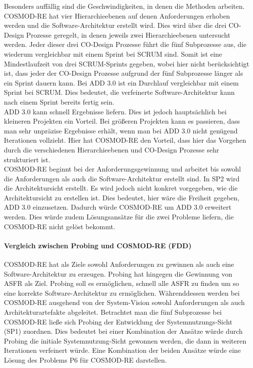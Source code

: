 Besonders auff\"allig sind die Geschwindigkeiten, in denen die Methoden arbeiten. COSMOD-RE hat vier Hierarchieebenen auf denen Anforderungen erhoben werden und die Software-Architektur erstellt wird. Dies wird \"uber die drei CO-Design Prozesse geregelt, in denen jeweils zwei Hierarchieebenen untersucht werden. Jeder dieser drei CO-Design Prozesse f\"uhrt die f\"unf Subprozesse aus, die wiederum vergleichbar mit einem Sprint bei SCRUM sind. Somit ist eine Mindestlaufzeit von drei SCRUM-Sprints gegeben, wobei hier nicht ber\"ucksichtigt ist, dass jeder der CO-Design Prozesse aufgrund der f\"unf Subprozesse l\"anger als ein Sprint dauern kann. Bei ADD 3.0 ist ein Durchlauf vergleichbar mit einem Sprint bei SCRUM. Dies bedeutet, die verfeinerte Software-Architektur kann nach einem Sprint bereits fertig sein.\\

ADD 3.0 kann schnell Ergebnisse liefern. Dies ist jedoch haupts\"achlich bei kleineren Projekten ein Vorteil. Bei gr\"o\ss{}eren Projekten kann es passieren, dass man sehr unpr\"azise Ergebnisse erh\"alt, wenn man bei ADD 3.0 nicht gen\"ugend Iterationen vollzieht. Hier hat COSMOD-RE den Vorteil, dass hier das Vorgehen durch die verschiedenen Hierarchieebenen und CO-Design Prozesse sehr strukturiert ist.\\

COSMOD-RE beginnt bei der Anforderungsgewinnung und arbeitet bis sowohl die Anforderungen als auch die Software-Architektur erstellt sind. In SP2 wird die Architektursicht erstellt. Es wird jedoch nicht konkret vorgegeben, wie die Architektursicht zu erstellen ist. Dies bedeutet, hier w\"are die Freiheit gegeben, ADD 3.0 einzusetzen. Dadurch w\"urde COSMOD-RE um ADD 3.0 erweitert werden. Dies w\"urde zudem L\"osungsans\"atze f\"ur die zwei Probleme liefern, die COSMOD-RE nicht gel\"ost bekommt.\\

\paragraph{Vergleich zwischen Probing und  COSMOD-RE (FDD)}
COSMOD-RE hat als Ziele sowohl Anforderungen zu gewinnen als auch eine Software-Architektur zu erzeugen. Probing hat hingegen die Gewinnung von ASFR als Ziel. Probing soll es erm\"oglichen, schnell alle ASFR zu finden um so eine korrekte Software-Architektur zu erm\"oglichen. W\"ahrenddessen werden bei COSMOD-RE ausgehend von der System-Vision sowohl Anforderungen als auch Architekturartefakte abgeleitet. Betrachtet man die f\"unf Subprozesse bei COSMOD-RE lie\ss{}e sich Probing der Entwicklung der Systemnutzungs-Sicht (SP1) zuordnen. Dies bedeutet bei einer Kombination der Ans\"atze w\"urde durch Probing die initiale Systemnutzung-Sicht gewonnen werden, die dann in weiteren Iterationen verfeinert w\"urde. Eine Kombination der beiden Ans\"atze w\"urde eine L\"osung des Problems P6 f\"ur COSMOD-RE darstellen.\\
